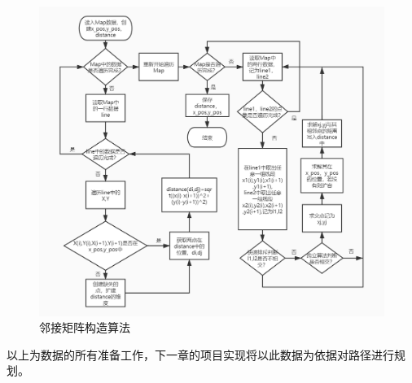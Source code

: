 \begin{figure}[H]
    \centering
    \includegraphics[width=13cm]{figure/create_distance.jpg}%
    \caption{邻接矩阵构造算法}
    \label{fig:ljjzgzsf}%
\end{figure}
以上为数据的所有准备工作，下一章的项目实现将以此数据为依据对路径进行规划。
